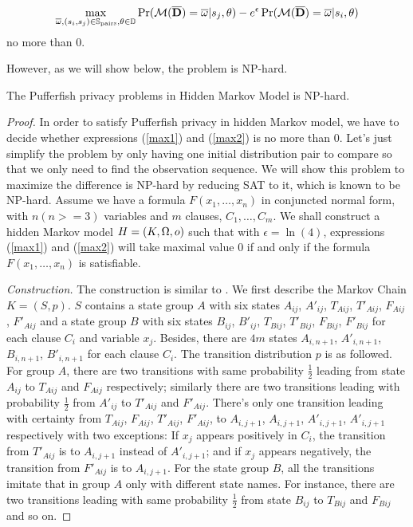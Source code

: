   \begin{equation}\label{max2}
     \max_{\overline{\omega},(s_i, s_j) \in
    \mathbb{S}_{\textmd{pairs}},\theta \in \mathbb{D}}
     { \Pr (\mathcal{M} (\overline{\mathbf{D}}) = \overline{\omega}| s_j, \theta) - e^\epsilon \Pr (\mathcal{M} (\overline{\mathbf{D}}) = \overline{\omega}| s_i, \theta) }
  \end{equation}
no more than $0$.

However, as we will show below, the problem is NP-hard.

\begin{theorem}
  The Pufferfish privacy problems in Hidden Markov Model is NP-hard.
\end{theorem}

\begin{proof}
  In order to satisfy Pufferfish privacy in hidden Markov model, we have to decide whether
  expressions (\ref{max1}) and (\ref{max2}) is no more than $0$.
  Let's just simplify the problem by only having one initial distribution pair to compare
  so that we only need to find the observation sequence.
  We will show this problem to maximize the difference is NP-hard by 
  reducing SAT to it, which is known to be NP-hard. Assume we have a formula $F(x_1,\ldots,x_n)$ in conjuncted normal form,
  with $n(n>=3)$ variables and $m$ clauses, $C_1,\ldots,C_m$. We shall construct a hidden Markov model $H = (K, \Omega, o)$
  such that with $\epsilon = \ln(4)$, expressions (\ref{max1}) and (\ref{max2}) will take maximal value $0$ 
  if and only if the formula $F(x_1,\ldots,x_n)$ is satisfiable.

  \textit{Construction.} The construction is similar to \cite{PCT:87:CMDP}. We first describe the Markov Chain $K =
  (S, p)$. $S$ contains a state group $A$ with six states $A_{ij}$, $A'_{ij}$, $T_{A ij}$, $T'_{Aij}$, $F_{Aij}$, $F'_{Aij}$ and
  a state group $B$ with six states $B_{ij}$, $B'_{ij}$, $T_{Bij}$, $T'_{Bij}$, $F_{Bij}$, $F'_{Bij}$
  for each clause $C_i$ and variable $x_j$. Besides, there are $4m$ states $A_{i,n+1}$, $A'_{i,n+1}$, $B_{i,n+1}$, $B'_{i,n+1}$ for each clause $C_i$.
  The transition distribution $p$ is as followed. For group $A$, there are two transitions with same probability $\frac{1}{2}$ leading from
  state $A_{ij}$ to $T_{Aij}$ and $F_{Aij}$ respectively; similarly there are two transitions leading with probability $\frac{1}{2}$
  from $A'_{ij}$ to $T'_{Aij}$ and $F'_{Aij}$. There's only one transition leading with certainty from $T_{Aij}$, $F_{Aij}$, $T'_{Aij}$, $F'_{Aij}$,
  to $A_{i,j+1}$, $A_{i,j+1}$, $A'_{i,j+1}$, $A'_{i,j+1}$ respectively with two exceptions: If $x_j$ appears positively in $C_i$,
  the transition from $T'_{Aij}$ is to $A_{i,j+1}$ instead of $A'_{i,j+1}$; and if $x_j$ appears negatively, the transition from
  $F'_{Aij}$ is to $A_{i,j+1}$. For the state group $B$, all the transitions imitate that in group $A$ only with different state names.
  For instance, there are two transitions leading with same probability $\frac{1}{2}$ from state $B_{ij}$ to $T_{Bij}$ and $F_{Bij}$ and so on.


\end{proof}
